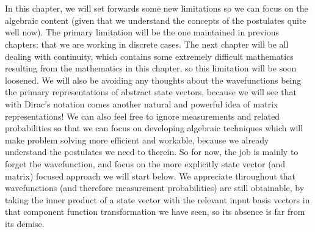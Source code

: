\\\\
In this chapter, we will set forwards some new limitations so we can focus on the algebraic content (given that we understand the concepts of the postulates quite well now). The primary limitation will be the one maintained in previous chapters: that we are working in discrete cases. The next chapter will be all dealing with continuity, which contains some extremely difficult mathematics resulting from the mathematics in this chapter, so this limitation will be soon loosened. We will also be avoiding any thoughts about the wavefunctions being the primary  representations of abstract state vectors, because we will see that with Dirac's notation comes another natural and powerful idea of matrix representations! We can also feel free to ignore measurements and related probabilities so that we can focus on developing algebraic techniques which will make problem solving more efficient and workable, because we already understand the postulates we need to therein. So for now, the job is mainly to forget the wavefunction, and focus on the more explicitly state vector (and matrix) focused approach we will start below. We appreciate throughout that wavefunctions (and therefore measurement probabilities) are still obtainable, by taking the inner product of a state vector with the relevant input basis vectors in that component function transformation we have seen, so its absence is far from its demise.
